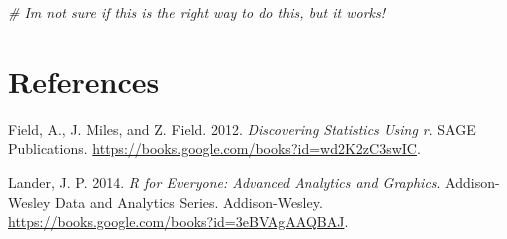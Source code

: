 \documentclass[
]{article}
\newenvironment{Shaded}{\begin{snugshade}}{\end{snugshade}}
\newcommand{\CommentTok}[1]{\textcolor[rgb]{0.56,0.35,0.01}{\textit{#1}}}
\newlength{\cslhangindent}
\newlength{\cslentryspacingunit} %
\newenvironment{CSLReferences}[2] %
 {%
  \setlength{\parindent}{0pt}
  \ifodd #1
  \let\oldpar\par
  \def\par{\hangindent=\cslhangindent\oldpar}
  \fi
  \setlength{\parskip}{#2\cslentryspacingunit}
 }%
 {}
\begin{document}
\begin{Shaded}
\begin{Highlighting}[]
\CommentTok{\# I\textquotesingle{}m not sure if this is the right way to do this, but it works!}
\end{Highlighting}
\end{Shaded}

\hypertarget{references}{%
\section*{References}\label{references}}

\hypertarget{refs}{}
\begin{CSLReferences}{1}{0}
\leavevmode{}%
Field, A., J. Miles, and Z. Field. 2012. \emph{Discovering Statistics
Using r}. SAGE Publications.
\url{https://books.google.com/books?id=wd2K2zC3swIC}.

\leavevmode{}%
Lander, J. P. 2014. \emph{R for Everyone: Advanced Analytics and
Graphics}. Addison-Wesley Data and Analytics Series. Addison-Wesley.
\url{https://books.google.com/books?id=3eBVAgAAQBAJ}.

\end{CSLReferences}
\end{document}
